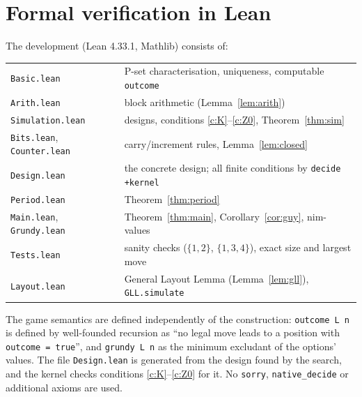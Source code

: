 \section{Formal verification in Lean}\label{sec:lean}

The development (Lean 4.33.1, Mathlib) consists of:
\begin{center}\small
\begin{tabular}{ll}
\toprule
\texttt{Basic.lean} & P-set characterisation, uniqueness, computable \texttt{outcome}\\
\texttt{Arith.lean} & block arithmetic (Lemma~\ref{lem:arith})\\
\texttt{Simulation.lean} & designs, conditions \ref{c:K}--\ref{c:Z0}, Theorem~\ref{thm:sim}\\
\texttt{Bits.lean}, \texttt{Counter.lean} & carry/increment rules, Lemma~\ref{lem:closed}\\
\texttt{Design.lean} & the concrete design; all finite conditions by \texttt{decide +kernel}\\
\texttt{Period.lean} & Theorem~\ref{thm:period}\\
\texttt{Main.lean}, \texttt{Grundy.lean} & Theorem~\ref{thm:main}, Corollary~\ref{cor:guy}, nim-values\\
\texttt{Tests.lean} & sanity checks ($\{1,2\}$, $\{1,3,4\}$), exact size and largest move\\
\texttt{Layout.lean} & General Layout Lemma (Lemma~\ref{lem:gll}), \texttt{GLL.simulate}\\
\bottomrule
\end{tabular}
\end{center}
The game semantics are defined independently of the construction: \texttt{outcome L n} is defined by
well-founded recursion as ``no legal move leads to a position with \texttt{outcome = true}'', and
\texttt{grundy L n} as the minimum excludant of the options' values.  The file \texttt{Design.lean} is
generated from the design found by the search, and the kernel checks conditions
\ref{c:K}--\ref{c:Z0} for it.  No \texttt{sorry}, \texttt{native\_decide} or additional axioms are used.

